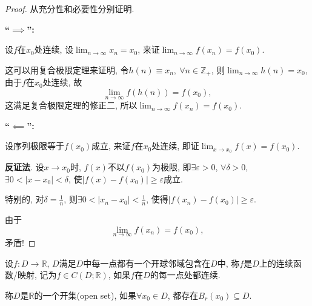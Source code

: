 \begin{proof}
    从充分性和必要性分别证明.

    \textbf{``$\implies$'':}
    
    设$f$在$x_0$处连续, 设$\displaystyle \lim_{n \to \infty} x_n = x_0$, 来证$\displaystyle \lim_{n \to \infty} f \left( x_n \right) = f \left( x_0 \right) $.

    这可以用复合极限定理来证明, 令$h \left( n \right) \equiv  x_n,\ \forall n \in \mathbb{Z}_{+}$, 则$\displaystyle \lim_{n \to \infty} h \left( n \right) = x_0$, 由于$f$在$x_0$处连续, 故
    \begin{equation}
        \lim_{n \to \infty} f \left( h \left( n \right) \right) = f \left( x_0 \right),
    \end{equation}
    这满足复合极限定理的修正二, 所以$\displaystyle \lim_{n \to \infty} f \left( x_n \right) = f \left( x_0 \right) $.

    \textbf{``$\impliedby$'':}

    设序列极限等于$f\left( x_0 \right) $成立, 来证$f$在$x_0$处连续, 即证$\displaystyle \lim_{x \to x_0} f\left( x \right)  = f\left( x_0 \right) $.

    \textbf{反证法}. 设$x\to x_0$时, $f\left( x \right) $不以$f\left( x_0 \right) $为极限, 即$\exists  \varepsilon > 0$, $\forall \delta > 0$, $\exists 0 < \left| x-x_0 \right| < \delta$, 使$\left| f\left( x \right) - f\left( x_0 \right) \right| \ge  \varepsilon$成立.
    
    特别的, 对$\delta = \frac{1}{n}$, 则$\exists 0 < \left| x_n - x_0 \right| < \frac{1}{n}$, 使得$\left| f\left( x_n \right) - f\left( x_0 \right)  \right| \geq \varepsilon$. 
    
    由于
    \begin{equation}
        \lim_{n \to \infty} f\left( x_n \right) = f\left( x_0 \right),
    \end{equation}
    矛盾!
\end{proof}

\begin{definition}
    设$f\colon D \to \mathbb{R}$, $D$满足$D$中每一点都有一个开球邻域包含在$D$中, 称$f$是$D$上的连续函数/映射, 记为$f \in C \left( D ; \mathbb{R} \right) $, 如果$f$在$D$的每一点处都连续.
\end{definition}

\begin{definition}
    称$D$是$\mathbb{R}$的一个开集(open set), 如果$\forall x_0 \in D$, 都存在$B_{r}\left( x_0 \right) \subseteq D$.
\end{definition}

